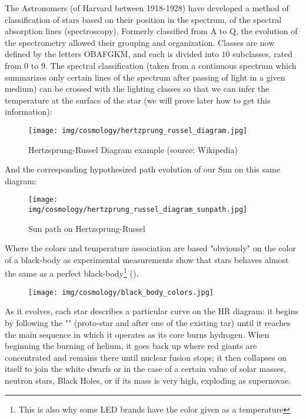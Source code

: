 	The Astronomers (of Harvard between 1918-1928) have developed a method of classification of stars based on their position in the spectrum, of the spectral absorption lines (spectroscopy). Formerly classified from A to Q, the evolution of the spectrometry allowed their grouping and organization. Classes are now defined by the letters OBAFGKM, and each is divided into $10$ subclasses, rated from $0$ to $9$. The spectral classification (taken from a continuous spectrum which summarizes only certain lines of the spectrum after passing of light in a given medium) can be crossed with the lighting classes so that we can infer the temperature at the surface of the star\label{hertzsprung russell diagram} (we will prove later how to get this information):
	\begin{figure}[H]
		\centering
		\texttt{[image: img/cosmology/hertzprung\_russel\_diagram.jpg]}
		\caption[Hertzsprung-Russel Diagram example]{Hertzsprung-Russel Diagram example (source: Wikipedia)}
	\end{figure}
	And the corresponding hypothesized path evolution of our Sun on this same diagram:
	\begin{figure}[H]
		\centering
		\texttt{[image: img/cosmology/hertzprung\_russel\_diagram\_sunpath.jpg]}	
		\caption{Sun path on Hertzsprung-Russel}
	\end{figure}
	Where the colors and temperature association are based "obviously" on the color of a black-body as experimental measurements show that stars behaves almost the same as a perfect black-body\footnote{This is also why some LED brands have the color given as a temperature} ().
	\begin{figure}[H]
		\centering
		\texttt{[image: img/cosmology/black\_body\_colors.jpg]}
	\end{figure}

	As it evolves, each star describes a particular curve on the HR diagram: it begins by following the "" (proto-star and after one of the existing tar) until it reaches the main sequence in which it operates as its core burns hydrogen. When beginning the burning of helium, it goes back up where red giants are concentrated and remains there until nuclear fusion stops; it then collapses on itself to join the white dwarfs or in the case of a certain value of solar masses, neutron stars, Black Holes, or if its mass is very high, exploding as supernovae.
	

